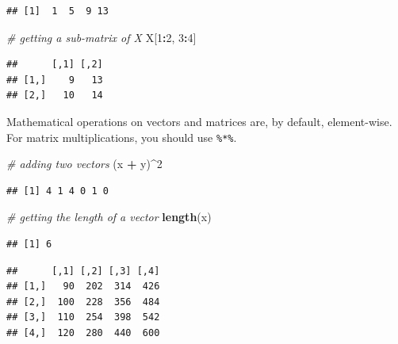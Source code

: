 \documentclass[
]{book}
\newenvironment{Shaded}{\begin{snugshade}}{\end{snugshade}}
\newcommand{\CommentTok}[1]{\textcolor[rgb]{0.56,0.35,0.01}{\textit{#1}}}
\newcommand{\DecValTok}[1]{\textcolor[rgb]{0.00,0.00,0.81}{#1}}
\newcommand{\KeywordTok}[1]{\textcolor[rgb]{0.13,0.29,0.53}{\textbf{#1}}}
\newcommand{\NormalTok}[1]{#1}
\newcommand{\OperatorTok}[1]{\textcolor[rgb]{0.81,0.36,0.00}{\textbf{#1}}}
\newcommand{\StringTok}[1]{\textcolor[rgb]{0.31,0.60,0.02}{#1}}
\begin{document}
\begin{verbatim}
## [1]  1  5  9 13
\end{verbatim}

\begin{Shaded}
\begin{Highlighting}[]
  \CommentTok{# getting a sub-matrix of X}
\NormalTok{  X[}\DecValTok{1}\OperatorTok{:}\DecValTok{2}\NormalTok{, }\DecValTok{3}\OperatorTok{:}\DecValTok{4}\NormalTok{]}
\end{Highlighting}
\end{Shaded}

\begin{verbatim}
##      [,1] [,2]
## [1,]    9   13
## [2,]   10   14
\end{verbatim}

Mathematical operations on vectors and matrices are, by default, element-wise. For matrix multiplications, you should use \texttt{\%*\%}.

\begin{Shaded}
\begin{Highlighting}[]
  \CommentTok{# adding two vectors}
\NormalTok{  (x }\OperatorTok{+}\StringTok{ }\NormalTok{y)}\OperatorTok{^}\DecValTok{2}
\end{Highlighting}
\end{Shaded}

\begin{verbatim}
## [1] 4 1 4 0 1 0
\end{verbatim}

\begin{Shaded}
\begin{Highlighting}[]
  \CommentTok{# getting the length of a vector}
  \KeywordTok{length}\NormalTok{(x)}
\end{Highlighting}
\end{Shaded}

\begin{verbatim}
## [1] 6
\end{verbatim}

\begin{Shaded}
\end{Shaded}

\begin{verbatim}
##      [,1] [,2] [,3] [,4]
## [1,]   90  202  314  426
## [2,]  100  228  356  484
## [3,]  110  254  398  542
## [4,]  120  280  440  600
\end{verbatim}
\end{document}
